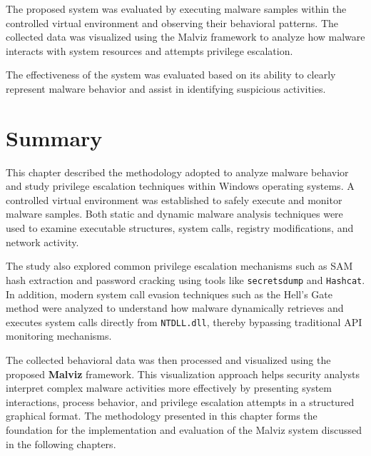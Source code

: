 The proposed system was evaluated by executing malware samples within the controlled 
virtual environment and observing their behavioral patterns. The collected data was 
visualized using the Malviz framework to analyze how malware interacts with system 
resources and attempts privilege escalation.

The effectiveness of the system was evaluated based on its ability to clearly represent 
malware behavior and assist in identifying suspicious activities.
\section{Summary}

This chapter described the methodology adopted to analyze malware behavior and 
study privilege escalation techniques within Windows operating systems. 
A controlled virtual environment was established to safely execute and monitor 
malware samples. Both static and dynamic malware analysis techniques were used 
to examine executable structures, system calls, registry modifications, and 
network activity.

The study also explored common privilege escalation mechanisms such as SAM 
hash extraction and password cracking using tools like \texttt{secretsdump} 
and \texttt{Hashcat}. In addition, modern system call evasion techniques such 
as the Hell's Gate method were analyzed to understand how malware dynamically 
retrieves and executes system calls directly from \texttt{NTDLL.dll}, thereby 
bypassing traditional API monitoring mechanisms.

The collected behavioral data was then processed and visualized using the 
proposed \textbf{Malviz} framework. This visualization approach helps security 
analysts interpret complex malware activities more effectively by presenting 
system interactions, process behavior, and privilege escalation attempts in 
a structured graphical format. The methodology presented in this chapter forms 
the foundation for the implementation and evaluation of the Malviz system 
discussed in the following chapters.

